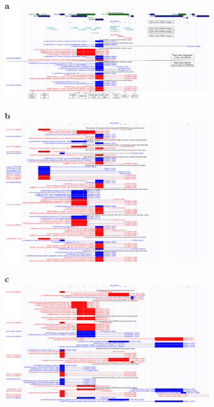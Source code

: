 \begin{figure}[!ht]
    \centering

    \begin{subfigure}[]{0.99\textwidth}
        \textbf{a}
        \\
        \includegraphics[width=\textwidth]{fig/ucsc_gwas2eqtl_il4_bcell_help.png}
    \end{subfigure}

    \begin{subfigure}[]{0.99\textwidth}
        \textbf{b}
        \\
        \includegraphics[width=\textwidth]{fig/ucsc_gwas2eqtl_il4_monocyte.png}
    \end{subfigure}

    \begin{subfigure}[]{0.99\textwidth}
        \textbf{c}
        \\
        \includegraphics[width=\textwidth]{fig/ucsc_gwas2eqtl_il4_frontalcortex.png}
    \end{subfigure}


\end{figure}
